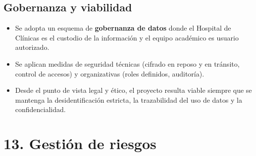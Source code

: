 \documentclass[
11pt, %
]{charter}
\begin{document}
\subsection*{Gobernanza y viabilidad}
\begin{itemize}
    \item Se adopta un esquema de \textbf{gobernanza de datos} donde el Hospital de Clínicas es el custodio de la información y el equipo académico es usuario autorizado.
    \item Se aplican medidas de seguridad técnicas (cifrado en reposo y en tránsito, control de accesos) y organizativas (roles definidos, auditoría).
    \item Desde el punto de vista legal y ético, el proyecto resulta viable siempre que se mantenga la desidentificación estricta, la trazabilidad del uso de datos y la confidencialidad.
\end{itemize}



\section{13. Gestión de riesgos}
\label{sec:riesgos}
\end{document}
